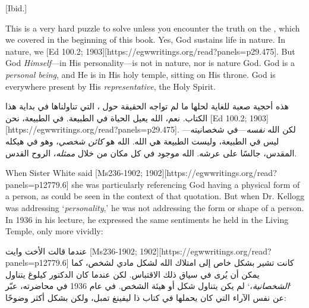 [Ibid.]


This is a very hard puzzle to solve unless you encounter the truth on the , which we covered in the beginning of this book. Yes, God sustains life in nature. In nature, we [Ed 100.2; 1903][https://egwwritings.org/read?panels=p29.475]. But God \textit{Himself}—in His personality—is not in nature, nor is nature God. God is a \textit{personal being}, and He is in His holy temple, sitting on His throne. God is everywhere present by His \textit{representative}, the Holy Spirit.


هذه أحجية صعبة للغاية لحلها ما لم تواجه الحقيقة حول ، التي تناولناها في بداية هذا الكتاب. نعم، الله يعيل الحياة في الطبيعة. في الطبيعة، نحن [Ed 100.2; 1903][https://egwwritings.org/read?panels=p29.475]. لكن الله \textit{نفسه}—في شخصانيته—ليس في الطبيعة، وليست الطبيعة هي الله. الله هو \textit{كائن شخصي}، وهو في هيكله المقدس، جالسًا على عرشه. الله موجود في كل مكان من خلال \textit{ممثله}، الروح القدس.


When Sister White said [Ms236-1902; 1902][https://egwwritings.org/read?panels=p12779.6] she was particularly referencing God having a physical form of a person, as could be seen in the context of that quotation. But when Dr. Kellogg was addressing ‘\textit{personality},’ he was not addressing the form or shape of a person. In 1936 in his lecture, he expressed the same sentiments he held in the Living Temple, only more vividly:


عندما قالت الأخت وايت [Ms236-1902; 1902][https://egwwritings.org/read?panels=p12779.6] كانت تشير بشكل خاص إلى امتلاك الله لشكل مادي لشخص، كما يمكن أن يُرى في سياق ذلك الاقتباس. لكن عندما كان الدكتور كيلوغ يتناول ‘\textit{الشخصانية}،‘ لم يكن يتناول شكل أو هيئة الشخص. في عام 1936 في محاضرته، عبّر عن نفس الآراء التي كان يحملها في كتاب ذا ليفينغ تمبل، ولكن بشكل أكثر وضوحًا:


